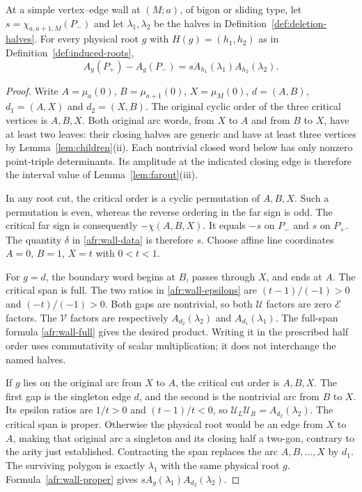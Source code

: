 \begin{theorem}\label{thm:A-S7}\leanok
At a simple vertex--edge wall at $(M;a)$, of bigon or sliding type,
let $s=\chi_{a,a+1,M}(P_-)$ and let $\lambda_1,\lambda_2$ be the
halves in Definition~\ref{def:deletion-halves}. For every physical root
$g$ with $H(g)=(h_1,h_2)$ as in Definition~\ref{def:induced-roots},
\begin{equation}\label{as7:law}
A_g(P_+)-A_g(P_-)=s A_{h_1}(\lambda_1)A_{h_2}(\lambda_2).
\end{equation}

\end{theorem}
\begin{proof}\leanok{}
Write $A=\mu_a(0)$, $B=\mu_{a+1}(0)$, $X=\mu_M(0)$,
$d=(A,B)$, $d_1=(A,X)$ and $d_2=(X,B)$. The original cyclic order
of the three critical vertices is $A,B,X$. Both original arc words,
from $X$ to $A$ and from $B$ to $X$, have at least two leaves:
their closing halves are generic and have at least three vertices by
Lemma~\ref{lem:children}(ii). Each nontrivial closed word below has
only nonzero point-triple determinants. Its amplitude at the indicated
closing edge is therefore the interval value of Lemma~\ref{lem:farout}(iii).

In any root cut, the critical order is a cyclic permutation of $A,B,X$.
Such a permutation is even, whereas the reverse ordering in the far
sign is odd. The critical far sign is consequently
$-\chi(A,B,X)$. It equals $-s$ on $P_-$ and $s$ on $P_+$.
The quantity $\delta$ in \eqref{afr:wall-data} is therefore $s$.
Choose affine line coordinates $A=0$, $B=1$, $X=t$ with $0<t<1$.

For $g=d$, the boundary word begins at $B$, passes through $X$,
and ends at $A$. The critical span is full. The two ratios in
\eqref{afr:wall-epsilons} are $(t-1)/(-1)>0$ and $(-t)/(-1)>0$.
Both gaps are nontrivial, so both $\mathcal U$ factors are zero
$\mathcal E$ factors. The $\mathcal V$ factors are respectively
$A_{d_2}(\lambda_2)$ and $A_{d_1}(\lambda_1)$.
The full-span formula \eqref{afr:wall-full} gives the desired product.
Writing it in the prescribed half order uses commutativity of scalar
multiplication; it does not interchange the named halves.

If $g$ lies on the original arc from $X$ to $A$, the critical cut
order is $A,B,X$. The first gap is the singleton edge $d$, and the
second is the nontrivial arc from $B$ to $X$. Its epsilon ratios are
$1/t>0$ and $(t-1)/t<0$, so
$\mathcal U_L\mathcal U_R=A_{d_2}(\lambda_2)$.
The critical span is proper. Otherwise the physical root would be an
edge from $X$ to $A$, making that original arc a singleton and its
closing half a two-gon, contrary to the arity just established.
Contracting the span replaces the arc $A,B,\ldots,X$ by $d_1$.
The surviving polygon is exactly $\lambda_1$ with the same physical
root $g$. Formula~\eqref{afr:wall-proper} gives
$sA_g(\lambda_1)A_{d_2}(\lambda_2)$.


\end{proof}
